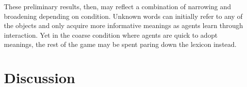 These preliminary results, then, may reflect a combination of narrowing and broadening depending on condition. Unknown words can initially refer to any of the objects and only acquire more informative meanings as agents learn through interaction. Yet in the coarse condition where agents are quick to adopt meanings, the rest of the game may be spent paring down the lexicon instead.





\section{Discussion}

